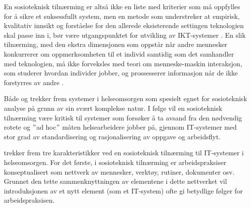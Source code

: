 \noindent
En sosioteknisk tilnærming er altså ikke en liste med kriterier som må oppfylles for å sikre et suksessfullt system, men en metode som understreker at empirisk, kvalitativ innsikt og forståelse for den allerede eksisterende settingen teknologien skal passe inn i, bør være utgangspunktet for utvikling av IKT-systemer \citep{Berg99}. En slik tilnærming, med den ekstra dimensjonen som oppstår når andre mennesker konkurrerer om oppmerksomheten til et individ samtidig som det samhandler med teknologien, må ikke forveksles med teori om menneske-maskin interaksjon, som studerer hvordan individer jobber, og prossesserer informasjon når de ikke forstyrres av andre \citep{Coiera07}.

\noindent
Både \citet{Coiera07} og \citet{Berg99} trekker frem systemer i helseomsorgen som spesielt egnet for sosioteknisk analyse på grunn av sin svært komplekse natur. I følge \citet{Berg99} vil en sosioteknisk tilnærming være kritisk til systemer som forsøker å ta avsand fra den nødvendig rotete og $"$ad hoc$"$ måten helsearbeidere jobber på, gjennom IT-systemer med stor grad av standardisering og rasjonalisering av oppgave og arbeidsflyt.











\citet{Berg99} trekker frem tre karakteristikker ved en sosioteknisk tilnærming til IT-systemer i helseomsorgen. For det første, i sosioteknisk tilnærming er arbeidspraksiser konseptualisert som nettverk av mennesker, verktøy, rutiner, dokumenter osv. Grunnet den tette sammenknyttningen av elementene i dette nettverket vil introduksjonen av et nytt element (som et IT-system) ofte gi betydlige følger for arbeidspraksisen. 






